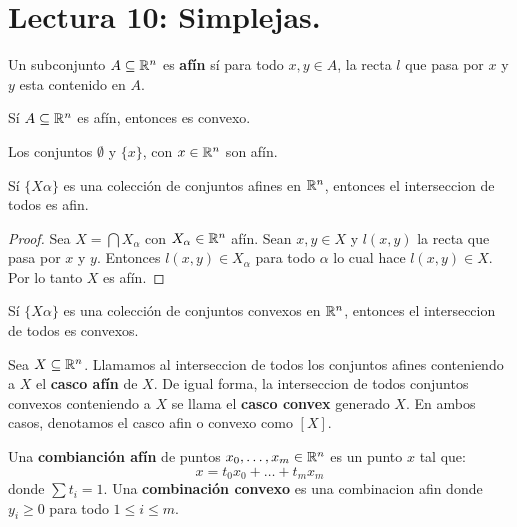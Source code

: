 \section*{Lectura 10: Simplejas.}

\begin{definition}
    Un subconjunto $A \subseteq \mathbb{R}^n$ es  \textbf{af\'in} s\'i para todo $x,y
    \in A$, la recta  $l$ que pasa por  $x$ y  $y$ esta contenido en  $A$.
\end{definition}

\begin{lemma}\label{10.23}
    S\'i $A \subseteq \mathbb{R}^n$ es af\'in, entonces es convexo.
\end{lemma}

\begin{example}\label{}
    Los conjuntos $\emptyset$ y $\{x\}$, con $x \in \mathbb{R}^n$ son af\'in.
\end{example}

\begin{theorem}\label{10.24}
    S\'i $\{X\alpha\}$ es una colecci\'on de conjuntos afines en $\mathbb{R}^n$,
    entonces el interseccion de todos es afin.
\end{theorem}
\begin{proof}
    Sea $X=\bigcap{X_\alpha}$ con $X_\alpha \in \mathbb{R}^n$ af\'in. Sean  $x,y \in X$
    y  $l(x,y)$ la recta que pasa por $x$ y  $y$. Entonces  $l(x,y) \in
    X_\alpha$ para todo $\alpha$ lo cual hace  $l(x,y) \in X$. Por lo tanto $X$
    es af\'in.
\end{proof}
\begin{corollary}
    S\'i $\{X\alpha\}$ es una colecci\'on de conjuntos convexos en $\mathbb{R}^n$,
    entonces el interseccion de todos es convexos.
\end{corollary}

\begin{definition}
    Sea $X \subseteq \mathbb{R}^n$. Llamamos al interseccion de todos los conjuntos
    afines conteniendo a $X$ el  \textbf{casco af\'in} de $X$. De igual forma,
    la interseccion de todos conjuntos convexos conteniendo a  $X$ se llama el
     \textbf{casco convex} generado $X$. En ambos casos, denotamos el casco afin
     o convexo como $[X]$.
\end{definition}

\begin{definition}
    Una \textbf{combianci\'on af\'in} de puntos $x_0, \dots, x_m \in \mathbb{R}^n$ es un
    punto $x$ tal que:
    \begin{equation*}
        x=t_0x_0+\dots+t_mx_m
    \end{equation*}
    donde $\sum{t_i}=1$. Una \textbf{combinaci\'on convexo} es una combinacion
    afin donde $y_i \geq 0$ para todo  $1 \leq i \leq m$.
\end{definition}
